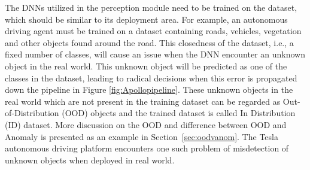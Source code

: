 The DNNs utilized in the perception module need to be trained on the dataset, which should be similar to its deployment area.
For example, an autonomous driving agent must be trained on a dataset containing roads, vehicles, vegetation and other objects found around the road.
This closedness of the dataset, i.e., a fixed number of classes, will cause an issue when the DNN encounter an unknown object in the real world.
This unknown object will be predicted as one of the classes in the dataset, leading to radical decisions when this error is propagated down the pipeline in Figure \ref{fig:Apollopipeline}.
These unknown objects in the real world which are not present in the training dataset can be regarded as Out-of-Distribution (OOD) objects and the trained dataset is called In Distribution (ID) dataset. 
More discussion on the OOD and difference between OOD and Anomaly is presented as an example in Section~\ref{sec:oodvanom}.
The Tesla autonomous driving platform encounters one such problem of misdetection of unknown objects when deployed in real world.
